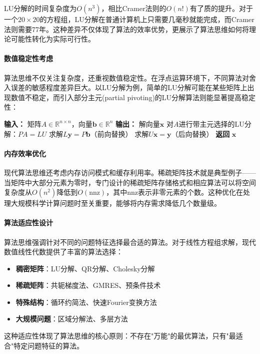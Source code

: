 LU分解的时间复杂度为$O(n^3)$，相比Cramer法则的$O(n!)$有了质的提升。对于一个$20 \times 20$的方程组，LU分解在普通计算机上只需要几毫秒就能完成，而Cramer法则需要77年。这种差异不仅体现了算法的效率优势，更展示了算法思维如何将理论可能性转化为实际可行性。

\paragraph{数值稳定性考虑}
算法思维不仅关注复杂度，还重视数值稳定性。在浮点运算环境下，不同算法对舍入误差的敏感程度差异巨大。以LU分解为例，简单的LU分解可能在某些矩阵上出现数值不稳定，而引入部分主元(partial pivoting)的LU分解算法则能显著提高稳定性：

\begin{algorithmic}[1]
\STATE \textbf{输入：} 矩阵$A \in \mathbb{R}^{n \times n}$，向量$\mathbf{b} \in \mathbb{R}^n$
\STATE \textbf{输出：} 解向量$\mathbf{x}$
\STATE 对$A$进行带主元选择的LU分解：$PA = LU$
\STATE 求解$L\mathbf{y} = P\mathbf{b}$（前向替换）
\STATE 求解$U\mathbf{x} = \mathbf{y}$（后向替换）
\STATE \textbf{返回} $\mathbf{x}$
\end{algorithmic}

\paragraph{内存效率优化}
现代算法思维还考虑内存访问模式和缓存利用率。稀疏矩阵技术就是典型例子——当矩阵中大部分元素为零时，专门设计的稀疏矩阵存储格式和相应算法可以将空间复杂度从$O(n^2)$降低到$O(\text{nnz})$，其中nnz表示非零元素的个数。这种优化在处理大规模科学计算问题时至关重要，能够将内存需求降低几个数量级。

\paragraph{算法适应性设计}
算法思维强调针对不同的问题特征选择最合适的算法。对于线性方程组求解，现代数值线性代数提供了丰富的算法选择：
\begin{itemize}
\item \textbf{稠密矩阵}：LU分解、QR分解、Cholesky分解
\item \textbf{稀疏矩阵}：共轭梯度法、GMRES、预条件技术
\item \textbf{特殊结构}：循环约简法、快速Fourier变换方法
\item \textbf{大规模问题}：区域分解法、多层方法
\end{itemize}

这种适应性体现了算法思维的核心原则：不存在"万能"的最优算法，只有"最适合"特定问题特征的算法。

